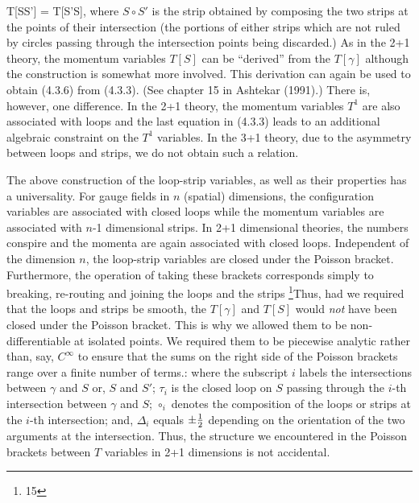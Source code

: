 T[S\circ S'] = T[S'\circ S],
where $S\circ S'$ is the strip obtained by composing the two strips at
the points of their intersection (the portions of either strips which
are not ruled by circles passing through the intersection points being
discarded.) As in the 2+1 theory, the momentum variables $T[S]$ can be
``derived'' from the $T[\gamma ]$ although the construction is somewhat
more involved. This derivation can again be used to obtain (4.3.6) from
(4.3.3). (See chapter 15 in Ashtekar (1991).)
There is, however, one difference. In the 2+1 theory, the momentum
variables $T^1$ are also associated with loops and the last equation in
(4.3.3) leads to an additional algebraic constraint on the $T^1$ variables.
In the 3+1 theory, due to the asymmetry between loops and strips, we do not
obtain such a relation.

The above construction of the loop-strip variables, as well as their
properties has a universality. For gauge fields in $n$ (spatial) dimensions,
the configuration variables are associated with closed loops while
the momentum variables are associated with $n$-1 dimensional strips.
In 2+1 dimensional theories, the numbers conspire and the momenta are again
associated with closed loops. Independent of the dimension $n$, the
loop-strip variables are closed under the Poisson bracket. Furthermore,
the operation of taking these brackets corresponds simply to breaking,
re-routing and joining the loops and the strips%
\footnote{15}{Thus, had we required that the loops and strips be smooth, the
$T[\gamma ]$ and $T[S]$ would {\it not} have been closed under the Poisson
bracket. This is why we allowed them to be non-differentiable at isolated
points. We required them to be piecewise analytic rather than, say,
$C^\infty$ to ensure that the sums on the right side of the Poisson brackets
range over a finite number of terms.}:
where the subscript $i$ labels the intersections between $\gamma$ and $S$
or, $S$ and $S'$; $\tau_i$ is the closed loop on $S$ passing through the
$i$-th intersection between $\gamma$ and $S$; $\circ_i$ denotes the
composition of the loops or strips at the $i$-th intersection; and,
$\Delta_i$ equals $\pm {1\over 2}$ depending on the orientation of the two
arguments at the intersection. Thus, the structure we encountered in the
Poisson brackets between $T$ variables in 2+1 dimensions is not
accidental.

